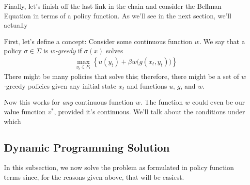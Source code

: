 \documentclass[a4paper,12pt]{scrartcl}
\begin{document}
Finally, let's finish off the last link in the chain and consider the
Bellman Equation in terms of a policy function. As we'll see in the next
section, we'll actually 

First, let's define a concept: Consider some continuous function $w$.
We say that a policy $\sigma\in\Sigma$ is \emph{$w$-greedy} if
$\sigma(x)$ solves 
\begin{align*}
  \max_{y_t \in F_t} 
  \left\{ u(y_t) + \beta w\big(g(x_t, y_t)\big)\right\}
\end{align*}
There might be many policies that solve this; therefore, there might be
a set of $w$-greedy policies given any initial state $x_t$ and functions
$u$, $g$, and $w$. 

Now this works for \emph{any} continuous function $w$. The function $w$ could even
be our value function $v^*$, provided it's continuous. We'll talk about
the conditions under which 

\subsection{Dynamic Programming Solution}

In this subsection, we now solve the problem as formulated in policy
function terms since, for the reasons given above, that will be
easiest. 









% 
\end{document}
